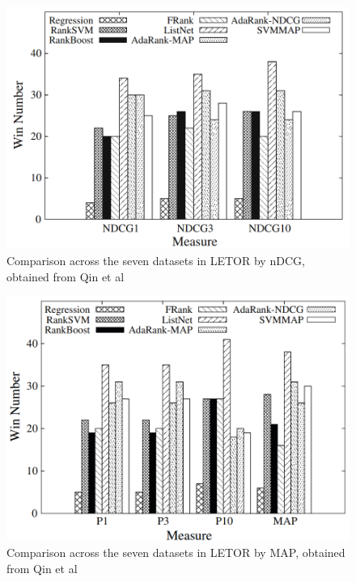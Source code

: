 \begin{figure}[!h]
\includegraphics[scale=0.30]{gfx/ndcg_winning_number}
\caption{Comparison across the seven datasets in LETOR by \ac{nDCG}, obtained from Qin et al \cite{Qin2010}}
\label{fig:ndcg_winning_number}
\end{figure}

\begin{figure}[!h]
\includegraphics[scale=0.30]{gfx/map_winning_number}
\caption{Comparison across the seven datasets in LETOR by \ac{MAP}, obtained from Qin et al \cite{Qin2010}}
\label{fig:map_winning_number}
\end{figure}


